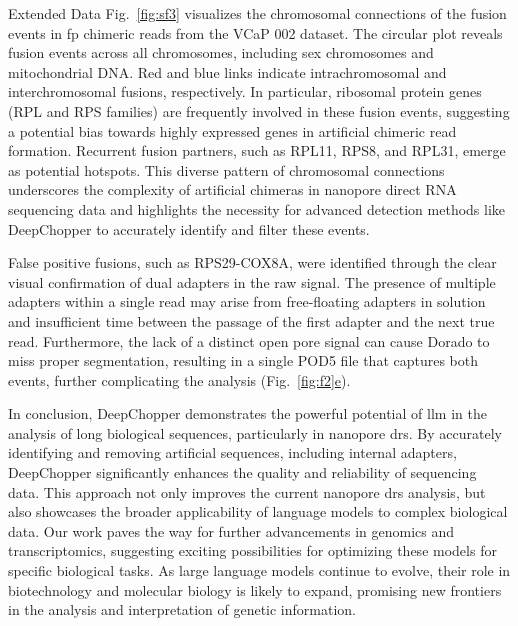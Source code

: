 \documentclass[pdflatex,sn-nature, lineno]{sn-jnl}%
\newcommand{\figref}[2]{Fig.~\hyperref[#1]{\ref*{#1}#2}}
\newcommand{\edfigref}[2]{Extended Data Fig.~\hyperref[#1]{\ref*{#1}#2}}
\theoremstyle{thmstyleone}%
\theoremstyle{thmstyletwo}%
\theoremstyle{thmstylethree}%
\begin{document}
\edfigref{fig:sf3}{} visualizes the chromosomal connections of the fusion events in \gls{fp} chimeric reads from the VCaP 002 dataset.
The circular plot reveals fusion events across all chromosomes, including sex chromosomes and mitochondrial DNA.
Red and blue links indicate intrachromosomal and interchromosomal fusions, respectively.
In particular, ribosomal protein genes (RPL and RPS families) are frequently involved in these fusion events, suggesting a potential bias towards highly expressed genes in artificial chimeric read formation.
Recurrent fusion partners, such as RPL11, RPS8, and RPL31, emerge as potential hotspots. This diverse pattern of chromosomal connections underscores the complexity of artificial chimeras in nanopore direct RNA sequencing data and highlights the necessity for advanced detection methods like DeepChopper to accurately identify and filter these events.

False positive fusions, such as RPS29-COX8A, were identified through the clear visual confirmation of dual adapters in the raw signal. The presence of multiple adapters within a single read may arise from free-floating adapters in solution and insufficient time between the passage of the first adapter and the next true read. 
Furthermore, the lack of a distinct open pore signal can cause Dorado to miss proper segmentation, resulting in a single POD5 file that captures both events, further complicating the analysis (\figref{fig:f2}{e}).

In conclusion, DeepChopper demonstrates the powerful potential of \gls{llm} in the analysis of long biological sequences, particularly in nanopore \gls{drs}.
By accurately identifying and removing artificial sequences, including internal adapters, DeepChopper significantly enhances the quality and reliability of sequencing data.
This approach not only improves the current nanopore \gls{drs} analysis, but also showcases the broader applicability of language models to complex biological data.
Our work paves the way for further advancements in genomics and transcriptomics, suggesting exciting possibilities for optimizing these models for specific biological tasks.
As large language models continue to evolve, their role in biotechnology and molecular biology is likely to expand, promising new frontiers in the analysis and interpretation of genetic information.
\end{document}
